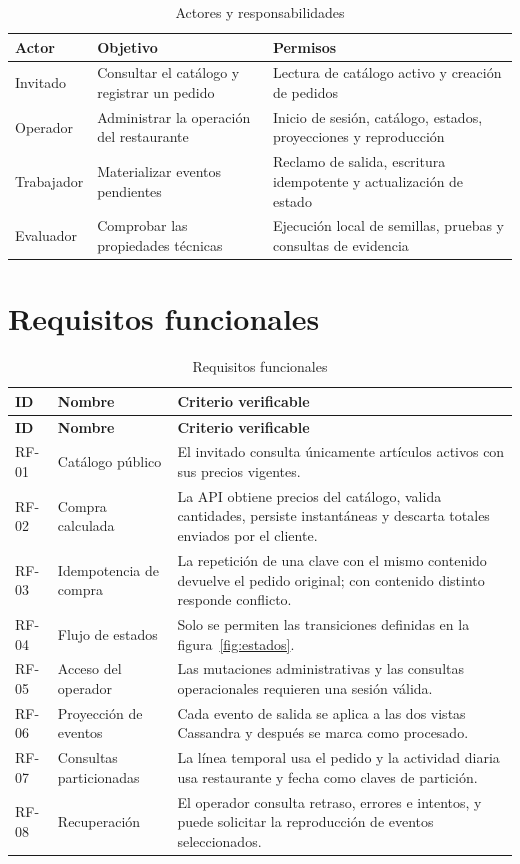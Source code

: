 \begin{table}[H]
  \centering
  \caption{Actores y responsabilidades}
  \label{tab:actores}
  \begin{tabularx}{\textwidth}{@{}p{3cm}YY@{}}
    \toprule
    \textbf{Actor} & \textbf{Objetivo} & \textbf{Permisos} \\
    \midrule
    Invitado & Consultar el catálogo y registrar un pedido & Lectura de catálogo activo y creación de pedidos \\
    Operador & Administrar la operación del restaurante & Inicio de sesión, catálogo, estados, proyecciones y reproducción \\
    Trabajador & Materializar eventos pendientes & Reclamo de salida, escritura idempotente y actualización de estado \\
    Evaluador & Comprobar las propiedades técnicas & Ejecución local de semillas, pruebas y consultas de evidencia \\
    \bottomrule
  \end{tabularx}
\end{table}

\section{Requisitos funcionales}

\begin{longtable}{@{}p{1.4cm}p{4cm}p{8.2cm}@{}}
  \caption{Requisitos funcionales}\label{tab:rf}\\
  \toprule
  \textbf{ID} & \textbf{Nombre} & \textbf{Criterio verificable} \\
  \midrule
  \endfirsthead
  \toprule
  \textbf{ID} & \textbf{Nombre} & \textbf{Criterio verificable} \\
  \midrule
  \endhead
  RF-01 & Catálogo público & El invitado consulta únicamente artículos activos con sus precios vigentes. \\
  RF-02 & Compra calculada & La API obtiene precios del catálogo, valida cantidades, persiste instantáneas y descarta totales enviados por el cliente. \\
  RF-03 & Idempotencia de compra & La repetición de una clave con el mismo contenido devuelve el pedido original; con contenido distinto responde conflicto. \\
  RF-04 & Flujo de estados & Solo se permiten las transiciones definidas en la figura~\ref{fig:estados}. \\
  RF-05 & Acceso del operador & Las mutaciones administrativas y las consultas operacionales requieren una sesión válida. \\
  RF-06 & Proyección de eventos & Cada evento de salida se aplica a las dos vistas Cassandra y después se marca como procesado. \\
  RF-07 & Consultas particionadas & La línea temporal usa el pedido y la actividad diaria usa restaurante y fecha como claves de partición. \\
  RF-08 & Recuperación & El operador consulta retraso, errores e intentos, y puede solicitar la reproducción de eventos seleccionados. \\
  \bottomrule
\end{longtable}

